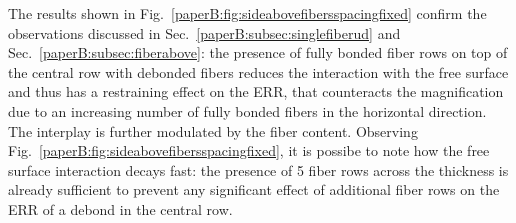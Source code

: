The results shown in Fig.~\ref{paperB:fig:sideabovefibersspacingfixed} confirm the observations discussed in Sec.~\ref{paperB:subsec:singlefiberud} and Sec.~\ref{paperB:subsec:fiberabove}: the presence of fully bonded fiber rows on top of the central row with debonded fibers reduces the interaction with the free surface and thus has a restraining effect on the ERR, that counteracts the magnification due to an increasing number of fully bonded fibers in the horizontal direction. The interplay is further modulated by the fiber content. Observing Fig.~\ref{paperB:fig:sideabovefibersspacingfixed}, it is possibe to note how the free surface interaction decays fast: the presence of 5 fiber rows across the thickness is already sufficient to prevent any significant effect of additional fiber rows on the ERR of a debond in the central row.


